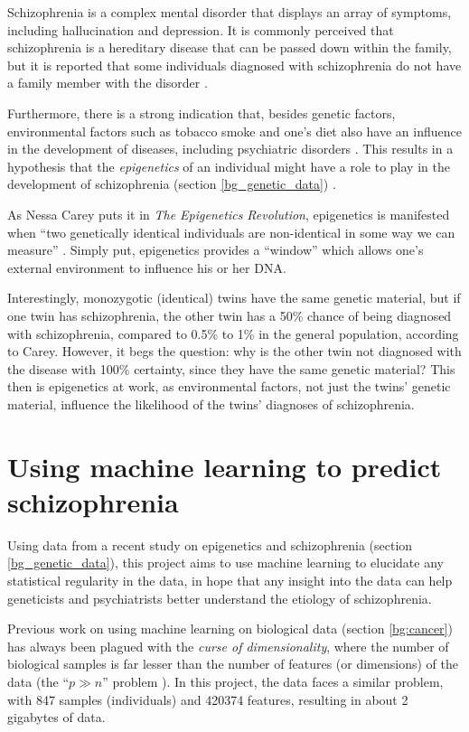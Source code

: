 \documentclass[12pt, twoside, a4paper]{report}
\begin{document}
Schizophrenia is a complex mental disorder that displays an array of symptoms, including hallucination and depression. It is commonly perceived that schizophrenia is a hereditary disease that can be passed down within the family, but it is reported that some individuals diagnosed with schizophrenia do not have a family member with the disorder \cite{RefWorks:8}. 

Furthermore, there is a strong indication that, besides genetic factors, environmental factors such as tobacco smoke and one's diet also have an influence in the development of diseases, including psychiatric disorders \cite{RefWorks:8, RefWorks:10, RefWorks:247}. This results in a hypothesis that the \textit{epigenetics} of an individual might have a role to play in the development of schizophrenia (section \ref{bg_genetic_data}) \cite{RefWorks:12}.

As Nessa Carey puts it in \textit{The Epigenetics Revolution}, epigenetics is manifested when ``two genetically identical individuals are non-identical in some way we can measure'' \cite{RefWorks:248}. Simply put, epigenetics provides a ``window'' which allows one's external environment to influence his or her DNA.

Interestingly, monozygotic (identical) twins have the same genetic material, but if one twin has schizophrenia, the other twin has a 50\% chance of being diagnosed with schizophrenia, compared to 0.5\% to 1\% in the general population, according to Carey. However, it begs the question: why is the other twin not diagnosed with the disease with 100\% certainty, since they have the same genetic material? This then is epigenetics at work, as environmental factors, not just the twins' genetic material, influence the likelihood of the twins' diagnoses of schizophrenia.


\section{Using machine learning to predict schizophrenia} \label{intro_ML}

Using data from a recent study on epigenetics and schizophrenia (section \ref{bg_genetic_data}), this project aims to use machine learning to elucidate any statistical regularity in the data, in hope that any insight into the data can help geneticists and psychiatrists better understand the etiology of schizophrenia.

Previous work on using machine learning on biological data (section \ref{bg:cancer}) has always been plagued with the \textit{curse of dimensionality}, where the number of biological samples is far lesser than the number of features (or dimensions) of the data (the ``$p \gg n$'' problem \cite{RefWorks:96}). In this project, the data faces a similar problem, with 847 samples (individuals) and 420374 features, resulting in about 2 gigabytes of data.
\end{document}
